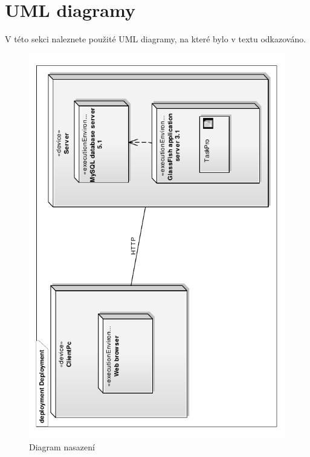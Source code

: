 \documentclass[11pt,twoside,a4paper]{book}
\begin{document}
\chapter{UML diagramy}
V této sekci naleznete použité UML diagramy, na které bylo v textu odkazováno.
\begin{figure}
\begin{center}
\includegraphics[angle=270]{images/deploymentDiagram}
\caption{Diagram nasazení}
\label{img:deploymentDiagram}
\end{center}
\end{figure}
\end{document}
